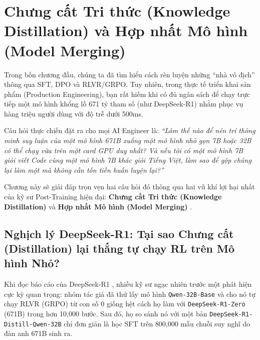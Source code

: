 \chapter{Chưng cất Tri thức (Knowledge Distillation) và Hợp nhất Mô hình (Model Merging)}
\label{ch:distillation_merging}

Trong bốn chương đầu, chúng ta đã tìm hiểu cách rèn luyện những ``nhà vô địch'' thông qua SFT, DPO và RLVR/GRPO. Tuy nhiên, trong thực tế triển khai sản phẩm (Production Engineering), bạn rất hiếm khi có đủ ngân sách để chạy trực tiếp một mô hình khổng lồ 671 tỷ tham số (như DeepSeek-R1) nhằm phục vụ hàng triệu người dùng với độ trễ dưới 500ms.

Câu hỏi thực chiến đặt ra cho mọi AI Engineer là: \textit{``Làm thế nào để nén trí thông minh suy luận của một mô hình 671B xuống một mô hình nhỏ gọn 7B hoặc 32B có thể chạy vừa trên một card GPU duy nhất? Và nếu tôi có một mô hình 7B giỏi viết Code cùng một mô hình 7B khác giỏi Tiếng Việt, làm sao để gộp chúng lại làm một mà không cần tốn tiền huấn luyện lại?''}

Chương này sẽ giải đáp trọn vẹn hai câu hỏi đó thông qua hai vũ khí lợi hại nhất của kỹ sư Post-Training hiện đại: \textbf{Chưng cất Tri thức (Knowledge Distillation)} \citep{hinton2015distilling, gu2024minillm, agarwal2024onpolicy, deepseek2025r1} và \textbf{Hợp nhất Mô hình (Model Merging)} \citep{yadav2023ties, yu2024language}.

\section{Nghịch lý DeepSeek-R1: Tại sao Chưng cất (Distillation) lại thắng tự chạy RL trên Mô hình Nhỏ?}
\label{sec:distill_vs_rl}

Khi đọc báo cáo của DeepSeek-R1 \citep{deepseek2025r1}, nhiều kỹ sư ngạc nhiên trước một phát hiện cực kỳ quan trọng: nhóm tác giả đã thử lấy mô hình \texttt{Qwen-32B-Base} và cho nó tự chạy RLVR (GRPO) từ con số 0 giống hệt cách họ làm với \texttt{DeepSeek-R1-Zero} (671B) trong hơn 10,000 bước. Sau đó, họ so sánh nó với một bản \texttt{DeepSeek-R1-Distill-Qwen-32B} chỉ đơn giản là học SFT trên 800,000 mẫu chuỗi suy nghĩ do đàn anh 671B sinh ra.


